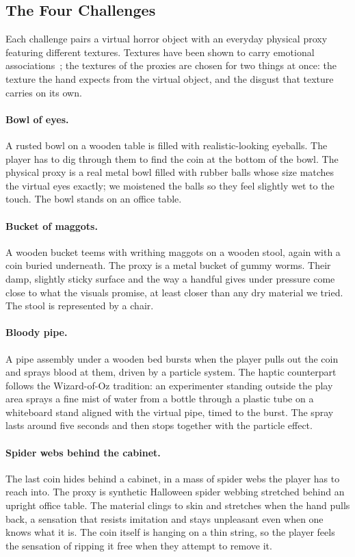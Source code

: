 
\subsection{The Four Challenges}
\label{sec:apparatus-challenges}

Each challenge pairs a virtual horror object with an everyday physical proxy featuring different textures. Textures have been shown to carry emotional associations~\cite{Iosifyan.2019}; the textures of the proxies are chosen for two things at once: the texture the hand expects from the virtual object, and the disgust that texture carries on its own.


\paragraph{Bowl of eyes.} A rusted bowl on a wooden table is filled with realistic-looking eyeballs. The player has to dig through them to find the coin at the bottom of the bowl. The physical proxy is a real metal bowl filled with rubber balls whose size matches the virtual eyes exactly; we moistened the balls so they feel slightly wet to the touch. The bowl stands on an office table.

\paragraph{Bucket of maggots.} A wooden bucket teems with writhing maggots on a wooden stool, again with a coin buried underneath. The proxy is a metal bucket of gummy worms. Their damp, slightly sticky surface and the way a handful gives under pressure come close to what the visuals promise, at least closer than any dry material we tried. The stool is represented by a chair.

\paragraph{Bloody pipe.} A pipe assembly under a wooden bed bursts when the player pulls out the coin and sprays blood at them, driven by a particle system. The haptic counterpart follows the Wizard-of-Oz tradition: an experimenter standing outside the play area sprays a fine mist of water from a bottle through a plastic tube on a whiteboard stand aligned with the virtual pipe, timed to the burst. The spray lasts around five seconds and then stops together with the particle effect.

\paragraph{Spider webs behind the cabinet.} The last coin hides behind a cabinet, in a mass of spider webs the player has to reach into. The proxy is synthetic Halloween spider webbing stretched behind an upright office table. The material clings to skin and stretches when the hand pulls back, a sensation that resists imitation and stays unpleasant even when one knows what it is. The coin itself is hanging on a thin string, so the player feels the sensation of ripping it free when they attempt to remove it.

